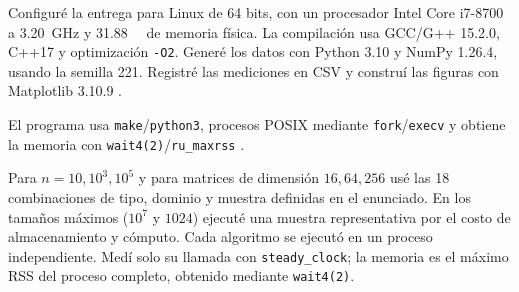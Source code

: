 Configuré la entrega para Linux de 64 bits, con un procesador Intel Core
i7-8700 a \SI{3.20}{\giga\hertz} y \SI{31.88}{\gibi\byte} de memoria física.
La compilación usa GCC/G++ 15.2.0, C++17 y optimización \texttt{-O2}. Generé
los datos con Python 3.10 y NumPy 1.26.4, usando la semilla 221. Registré las
mediciones en CSV y construí las figuras con Matplotlib 3.10.9
\cite{numpy2026,pythoncsv2026,matplotlib2026}.

El programa usa \texttt{make}/\texttt{python3}, procesos POSIX mediante
\texttt{fork}/\texttt{execv} y obtiene la memoria con
\texttt{wait4(2)}/\texttt{ru\_maxrss} \cite{linuxwait42026}.

Para $n=10,10^3,10^5$ y para matrices de dimensión $16,64,256$ usé las 18
combinaciones de tipo, dominio y muestra definidas en el enunciado. En los
tamaños máximos ($10^7$ y $1024$) ejecuté una muestra representativa por el
costo de almacenamiento y cómputo. Cada algoritmo se ejecutó en un proceso
independiente. Medí solo su llamada con \texttt{steady\_clock}; la memoria es
el máximo RSS del proceso completo, obtenido mediante \texttt{wait4(2)}.
